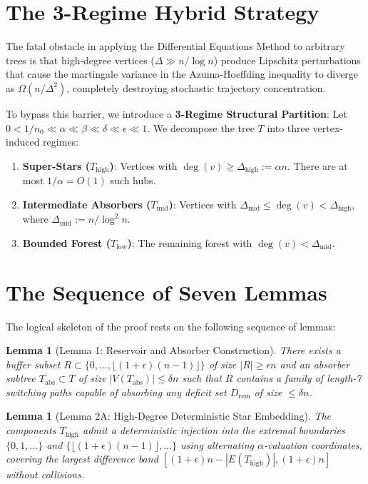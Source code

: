 \documentclass[11pt,a4paper]{article}
\newtheorem{lemma}[theorem]{Lemma}
\begin{document}
\section{The 3-Regime Hybrid Strategy}

The fatal obstacle in applying the Differential Equations Method to arbitrary trees is that high-degree vertices ($\Delta \gg n/\log n$) produce Lipschitz perturbations that cause the martingale variance in the Azuma-Hoeffding inequality to diverge as $\Omega(n / \Delta^2)$, completely destroying stochastic trajectory concentration.

To bypass this barrier, we introduce a \textbf{3-Regime Structural Partition}:
Let $0 < 1/n_0 \ll \alpha \ll \beta \ll \delta \ll \epsilon \ll 1$. We decompose the tree $T$ into three vertex-induced regimes:
\begin{enumerate}
    \item \textbf{Super-Stars ($T_{\text{high}}$)}: Vertices with $\deg(v) \ge \Delta_{\text{high}} := \alpha n$. There are at most $1/\alpha = O(1)$ such hubs.
    \item \textbf{Intermediate Absorbers ($T_{\text{mid}}$)}: Vertices with $\Delta_{\text{mid}} \le \deg(v) < \Delta_{\text{high}}$, where $\Delta_{\text{mid}} := n / \log^2 n$.
    \item \textbf{Bounded Forest ($T_{\text{low}}$)}: The remaining forest with $\deg(v) < \Delta_{\text{mid}}$.
\end{enumerate}

\section{The Sequence of Seven Lemmas}

The logical skeleton of the proof rests on the following sequence of lemmas:

\begin{lemma}[Lemma 1: Reservoir and Absorber Construction]\label{lem:1}
There exists a buffer subset $R \subset \{0, \dots, \lfloor(1+\epsilon)(n-1)\rfloor\}$ of size $|R| \ge \epsilon n$ and an absorber subtree $T_{\text{abs}} \subset T$ of size $|V(T_{\text{abs}})| \le \delta n$ such that $R$ contains a family of length-7 switching paths capable of absorbing any deficit set $D_{\text{rem}}$ of size $\le \delta n$.
\end{lemma}

\begin{lemma}[Lemma 2A: High-Degree Deterministic Star Embedding]\label{lem:2a}
The components $T_{\text{high}}$ admit a deterministic injection into the extremal boundaries $\{0, 1, \dots\}$ and $\{\lfloor(1+\epsilon)(n-1)\rfloor, \dots\}$ using alternating $\alpha$-valuation coordinates, covering the largest difference band $[(1+\epsilon)n - |E(T_{\text{high}})|, (1+\epsilon)n]$ without collisions.
\end{lemma}
\end{document}

